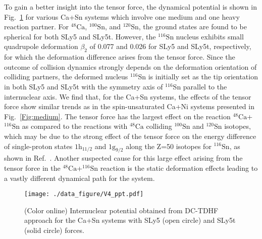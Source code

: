\documentclass[aps,prc,twocolumn,showpacs,superscriptaddress,longbibliography,nofootinbib,floatfix,10pt]{revtex4-1}
\begin{document}
To gain a better insight into the tensor force, the dynamical potential is shown in Fig.~\ref{Fig:heavy} for various Ca+Sn systems
which involve one medium and
one heavy reaction partner. For $^{48}\mathrm{Ca}$, $^{100}\mathrm{Sn}$, and $^{120}\mathrm{Sn}$, the ground states are found to be spherical for
both SLy5 and SLy5t. However, the $^{116}\mathrm{Sn}$ nucleus exhibits small quadrupole deformation $\beta_2$ of 0.077 and 0.026 for SLy5 and SLy5t, respectively,
for which the deformation difference arises from the tensor force. Since the outcome of collision dynamics strongly depends on the deformation orientation
of colliding partners, the deformed nucleus $^{116}$Sn is initially set as the tip orientation in both SLy5 and SLy5t with the symmetry axis of $^{116}$Sn parallel to the internuclear axis. We find that, for the Ca+Sn systems,
the effects of the tensor force show similar trends as in the spin-unsaturated Ca+Ni systems presented in Fig.~\ref{Fig:medium}.
The tensor force has the largest effect on the reaction $^{48}\mathrm{Ca}$+$^{116}\mathrm{Sn}$ as compared to the reactions with $^{48}\mathrm{Ca}$ colliding $^{100}\mathrm{Sn}$ and $^{120}\mathrm{Sn}$
isotopes, which may be due to the strong effect of the tensor force on the energy difference of single-proton states  $1\mathrm{h}_{11/2}$ and $1\mathrm{g}_{9/2}$ along the Z=50 isotopes for $^{116}\mathrm{Sn}$, as shown in Ref.~\cite{Colo2007_PLB646-227}.
Another suspected cause for this large effect arising from the tensor force in the $^{48}\mathrm{Ca}$+$^{116}\mathrm{Sn}$ reaction is the static deformation effects leading to a vastly different dynamical path for the system.
\begin{figure}[t]
    \texttt{[image: ./data\_figure/V4\_ppt.pdf]}
    \caption{(Color online) Internuclear potential obtained from DC-TDHF approach for the Ca+Sn systems with SLy5 (open circle) and SLy5t (solid circle) forces.
        \label{Fig:heavy}}
\end{figure}
\end{document}
